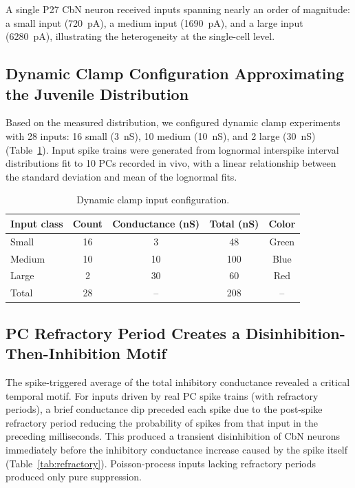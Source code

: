 \documentclass[11pt]{article}
\begin{document}
A single P27 CbN neuron received inputs spanning nearly an order of magnitude: a small input (720~pA), a medium input (1690~pA), and a large input (6280~pA), illustrating the heterogeneity at the single-cell level.

\subsection{Dynamic Clamp Configuration Approximating the Juvenile Distribution}

Based on the measured distribution, we configured dynamic clamp experiments with 28 inputs: 16 small (3~nS), 10 medium (10~nS), and 2 large (30~nS) (Table~\ref{tab:dynclamp}). Input spike trains were generated from lognormal interspike interval distributions fit to 10 PCs recorded in vivo, with a linear relationship between the standard deviation and mean of the lognormal fits.

\begin{table}[H]
\centering
\caption{Dynamic clamp input configuration.}
\label{tab:dynclamp}
\begin{tabular}{lcccc}
\toprule
\textbf{Input class} & \textbf{Count} & \textbf{Conductance (nS)} & \textbf{Total (nS)} & \textbf{Color} \\
\midrule
Small & 16 & 3 & 48 & Green \\
Medium & 10 & 10 & 100 & Blue \\
Large & 2 & 30 & 60 & Red \\
Total & 28 & -- & 208 & -- \\
\bottomrule
\end{tabular}
\end{table}

\subsection{PC Refractory Period Creates a Disinhibition-Then-Inhibition Motif}

The spike-triggered average of the total inhibitory conductance revealed a critical temporal motif. For inputs driven by real PC spike trains (with refractory periods), a brief conductance dip preceded each spike due to the post-spike refractory period reducing the probability of spikes from that input in the preceding milliseconds. This produced a transient disinhibition of CbN neurons immediately before the inhibitory conductance increase caused by the spike itself (Table~\ref{tab:refractory}). Poisson-process inputs lacking refractory periods produced only pure suppression.
\end{document}
